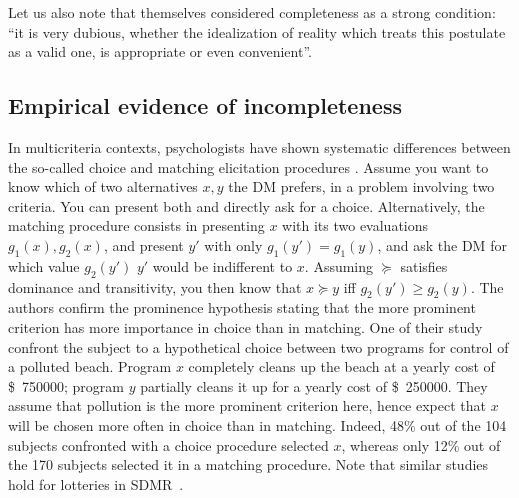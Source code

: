 \documentclass[french, english]{llncs}
\newcommand{\dollars}[1]{\SI{#1}[\$]{}}
\begin{document}
	Let us also note that \citep[p. 630]{von_neumann_theory_2004} themselves considered completeness as a strong condition: “it is very dubious, whether the idealization of reality which treats this postulate as a valid one, is appropriate or even convenient”.

	\subsection{Empirical evidence of incompleteness}
	
	In multicriteria contexts, psychologists have shown systematic differences between the so-called choice and matching elicitation procedures \citep{tversky_contingent_1988}. Assume you want to know which of two alternatives $x, y$ the \ac{DM} prefers, in a problem involving two criteria. You can present both and directly ask for a choice. Alternatively, the matching procedure consists in presenting $x$ with its two evaluations $g_1(x), g_2(x)$, and present $y'$ with only $g_1(y') = g_1(y)$, and ask the \ac{DM} for which value $g_2(y')$ $y'$ would be indifferent to $x$. Assuming $\succeq$ satisfies dominance and transitivity, you then know that $x \succeq y$ iff $g_2(y') ≥ g_2(y)$. The authors confirm the prominence hypothesis stating that the more prominent criterion has more importance in choice than in matching. One of their study confront the subject to a hypothetical choice between two programs for control of a polluted beach. Program $x$ completely cleans up the beach at a yearly cost of \dollars{750 000}; program $y$ partially cleans it up for a yearly cost of \dollars{250 000}. They assume that pollution is the more prominent criterion here, hence expect that $x$ will be chosen more often in choice than in matching. Indeed, 48\% out of the 104 subjects confronted with a choice procedure selected $x$, whereas only 12\% out of the 170 subjects selected it in a matching procedure. Note that similar studies hold for lotteries in SDMR~\citep{luce_utility_2000}.
	
\end{document}
